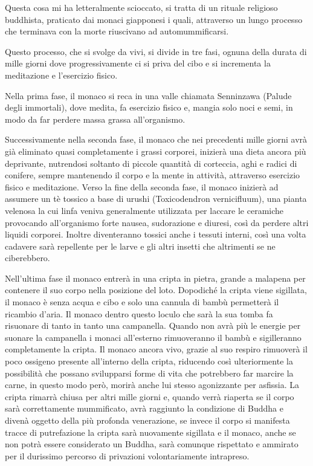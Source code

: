 \documentclass[12pt]{book} %
\begin{document}
Questa cosa mi ha letteralmente scioccato, si tratta di un rituale religioso buddhista, praticato dai monaci giapponesi
i quali, attraverso un lungo processo che terminava con la morte riuscivano ad automummificarsi. 

Questo processo, che si svolge da vivi, si divide in tre fasi, ognuna della durata di mille giorni dove progressivamente
ci si priva del cibo e si incrementa la meditazione e l'esercizio fisico.

Nella prima fase, il monaco si reca in una valle chiamata Senninzawa ({\textquotedbl}Palude degli
immortali{\textquotedbl}), dove medita, fa esercizio fisico e, mangia solo noci e semi, in modo da far perdere massa
grassa all'organismo.

Successivamente nella seconda fase, il monaco che nei precedenti mille giorni avrà già eliminato quasi completamente i
grassi corporei, inizierà una dieta ancora più deprivante, nutrendosi soltanto di piccole quantità di corteccia, aghi e
radici di conifere, sempre mantenendo il corpo e la mente in attività, attraverso esercizio fisico e meditazione. Verso
la fine della seconda fase, il monaco inizierà ad assumere un tè tossico a base di urushi (Toxicodendron vernicifluum),
una pianta velenosa la cui linfa veniva generalmente utilizzata per laccare le ceramiche provocando all'organismo forte
nausea, sudorazione e diuresi, così da perdere altri liquidi corporei. Inoltre diventeranno tossici anche i tessuti
interni, così una volta cadavere sarà repellente per le larve e gli altri insetti che altrimenti se ne ciberebbero.

Nell'ultima fase il monaco entrerà in una cripta in pietra, grande a malapena per contenere il suo
corpo nella posizione del loto. Dopodiché la cripta viene sigillata, il monaco è senza acqua e cibo e solo una cannula
di bambù permetterà il ricambio d'aria. Il monaco dentro questo loculo che sarà la sua tomba fa risuonare di tanto in
tanto una campanella. Quando non avrà più le energie per suonare la campanella i monaci
all'esterno rimuoveranno il bambù e sigilleranno completamente la cripta. Il monaco ancora vivo,
grazie al suo respiro rimuoverà il poco ossigeno presente all'interno della cripta, riducendo così
ulteriormente la possibilità che possano svilupparsi forme di vita che potrebbero far marcire la carne, in questo modo
però, morirà anche lui stesso agonizzante per asfissia. La cripta rimarrà chiusa per altri mille giorni e, quando verrà
riaperta se il corpo sarà correttamente mummificato, avrà raggiunto la condizione di Buddha e divenà oggetto della più
profonda venerazione, se invece il corpo si manifesta tracce di putrefazione la cripta sarà nuovamente sigillata e il
monaco, anche se non potrà essere considerato un Buddha, sarà comunque rispettato e ammirato per il durissimo percorso
di privazioni volontariamente intrapreso. 
\end{document}
